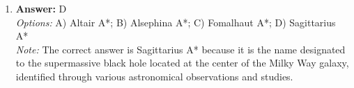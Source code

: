\documentclass[12pt]{article}
\begin{document}
\begin{enumerate}[label=\arabic*.]
\\ \textit{Note:} The correct answer lists the ingredients of the solar nebula in order of abundance, with light gases such as hydrogen and helium being the most prevalent, followed by hydrogen compounds, then rocks, and finally metals, reflecting the compositional gradient observed in the early solar system formation.
\item \textbf{Answer:} D
\\ \textit{Options:} A) Altair A*; B) Alsephina A*; C) Fomalhaut A*; D) Sagittarius A*
\\ \textit{Note:} The correct answer is Sagittarius A* because it is the name designated to the supermassive black hole located at the center of the Milky Way galaxy, identified through various astronomical observations and studies.
\end{enumerate}
\end{document}
